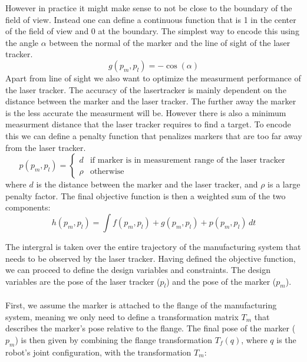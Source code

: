 \documentclass{svproc}
\begin{document}
However in practice it might make sense to not be close to the boundary of the field of view.
Instead one can define a continuous function that is 1 in the center of the field of view and 0 at the boundary.
The simplest way to encode this using the angle $\alpha$ between the normal of the marker and the line of sight of the laser tracker.
\begin{equation}
    g(p_m,p_l) = -\cos(\alpha)
\end{equation}
Apart from line of sight we also want to optimize the measurment performance of the laser tracker.
The accuracy of the lasertracker is mainly dependent on the distance between the marker and the laser tracker.
The further away the marker is the less accurate the measurment will be. However there is also a minimum measurment distance that the laser tracker requires to find a target.
To encode this we can define a penalty function that penalizes markers that are too far away from the laser tracker.
\begin{equation}
    p(p_m,p_l) =  \begin{cases}
        d & \text{if marker is in measurement range of the laser tracker} \\
        \rho & \text{otherwise}
    \end{cases}
\end{equation}
where $d$ is the distance between the marker and the laser tracker, and $\rho$ is a large penalty factor.
The final objective function is then a weighted sum of the two components:
\begin{equation}
    h(p_m,p_l) = \int f(p_m,p_l) +  g(p_m,p_l) + p(p_m,p_l) \, dt
    \label{eq:objective}
\end{equation}

The intergral is taken over the entire trajectory of the manufacturing system that needs to be observed by the laser tracker.
Having defined the objective function, we can proceed to define the design variables and constraints.
The design variables are the pose of the laser tracker ($p_l$) and the pose of the marker ($p_m$).\\
\\
First, we assume the marker is attached to the flange of the manufacturing system, meaning we only need to define a transformation matrix $T_{m}$ that describes the marker's pose relative to the flange.
The final pose of the marker ($p_m$) is then given by combining the flange transformation $T_{f}(q)$, where $q$ is the robot's joint configuration, with the transformation $T_{m}$:
\end{document}
